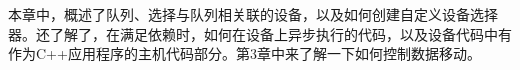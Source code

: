 本章中，概述了队列、选择与队列相关联的设备，以及如何创建自定义设备选择器。还了解了，在满足依赖时，如何在设备上异步执行的代码，以及设备代码中有作为C++应用程序的主机代码部分。第3章中来了解一下如何控制数据移动。\par

\newpage